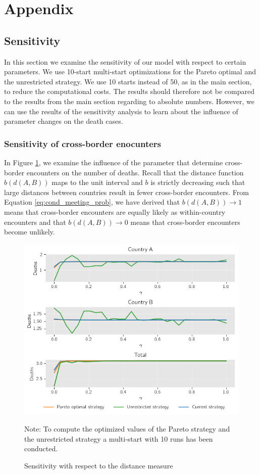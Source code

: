 \appendix
{}
\section{Appendix}
\subsection{Sensitivity}
\label{A:sensitivity}
In this section we examine the sensitivity of our model with respect to certain parameters. We use 10-start multi-start optimizations for the Pareto optimal and the unrestricted strategy. We use 10 starts instead of 50, as in the main section, to reduce the computational costs. The results should therefore not be compared to the results from the main section regarding to absolute numbers. However, we can use the results of the sensitivity analysis to learn about the influence of parameter changes on the death cases.

\subsubsection{Sensitivity of cross-border enocunters}
\label{A:encounters}
In Figure \ref{fig:sensitivity}, we examine the influence of the parameter that determine cross-border encounters on the number of deaths. Recall that the distance function $b(d(A,B))$ maps to the unit interval and $b$ is strictly decreasing such that large distances between countries result in fewer cross-border encounters. From Equation \eqref{eq:cond_meeting_prob}, we have derived that $b(d(A,B)) \to 1$ means that cross-border encounters are equally likely as within-country encounters and that $b(d(A,B)) \to 0$ means that cross-border encounters become unlikely.
\begin{figure}[h!]
\centering
\includegraphics[scale=0.59]{images/sensitivity.png}
\begin{flushleft}
\scriptsize{Note:} To compute the optimized values of the Pareto strategy and the unrestricted strategy a multi-start with 10 runs has been conducted.
\end{flushleft}
\caption{Sensitivity with respect to the distance measure}
\label{fig:sensitivity}
\end{figure}

